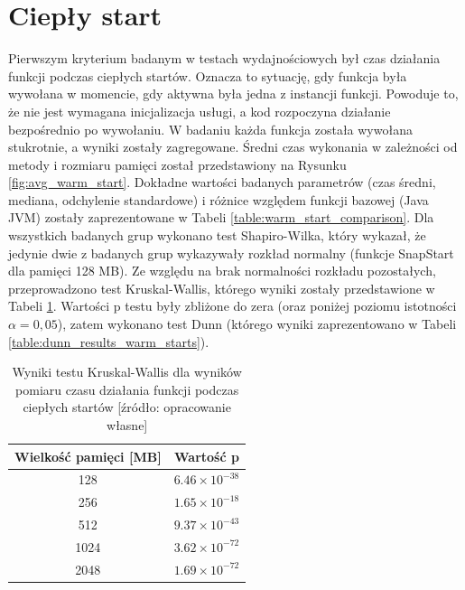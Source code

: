 \section{Ciepły start}\label{chapter:results_warm_start}

Pierwszym kryterium badanym w testach wydajnościowych był czas działania funkcji podczas ciepłych startów.
Oznacza to sytuację, gdy funkcja była wywołana w momencie, gdy aktywna była jedna z instancji funkcji.
Powoduje to, że nie jest wymagana inicjalizacja usługi, a kod rozpoczyna działanie bezpośrednio po wywołaniu.
W badaniu każda funkcja została wywołana stukrotnie, a wyniki zostały zagregowane.
Średni czas wykonania w zależności od metody i rozmiaru pamięci został przedstawiony na Rysunku \ref{fig:avg_warm_start}.
Dokładne wartości badanych parametrów (czas średni, mediana, odchylenie standardowe) i różnice względem funkcji bazowej (Java JVM) zostały zaprezentowane w Tabeli \ref{table:warm_start_comparison}.
Dla wszystkich badanych grup wykonano test Shapiro-Wilka, który wykazał, że jedynie dwie z badanych grup wykazywały rozkład normalny (funkcje SnapStart dla pamięci 128 MB).
Ze względu na brak normalności rozkładu pozostałych, przeprowadzono test Kruskal-Wallis, którego wyniki zostały przedstawione w Tabeli \ref{table:kruskal_wallis_test_warm_starts}.
Wartości p testu były zbliżone do zera (oraz poniżej poziomu istotności $\alpha = 0,05$), zatem wykonano test Dunn (którego wyniki zaprezentowano w Tabeli \ref{table:dunn_results_warm_starts}).

\begin{table}[h!]
    \centering
    \caption{Wyniki testu Kruskal-Wallis dla wyników pomiaru czasu działania funkcji podczas ciepłych startów [źródło: opracowanie własne]}
    \begin{tabular}{|c|c|}
    \hline
    \textbf{Wielkość pamięci [MB]} & \textbf{Wartość p} \\
    \hline
    128 & $6.46 \times 10^{-38}$ \\
    \hline
    256 & $1.65 \times 10^{-18}$ \\
    \hline
    512 & $9.37 \times 10^{-43}$ \\
    \hline
    1024 & $3.62 \times 10^{-72}$ \\
    \hline
    2048 & $1.69 \times 10^{-72}$ \\
    \hline
    \end{tabular}
    \label{table:kruskal_wallis_test_warm_starts}
\end{table}

